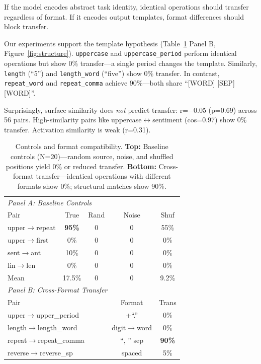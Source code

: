 \documentclass[sigconf,anonymous]{acmart}
\begin{document}
If the model encodes abstract task identity, identical operations should transfer regardless of format. If it encodes output templates, format differences should block transfer.

Our experiments support the template hypothesis (Table~\ref{tab:controls_format} Panel B, Figure~\ref{fig:structure}). \texttt{uppercase} and \texttt{uppercase\_period} perform identical operations but show 0\% transfer---a single period changes the template. Similarly, \texttt{length} (``5'') and \texttt{length\_word} (``five'') show 0\% transfer. In contrast, \texttt{repeat\_word} and \texttt{repeat\_comma} achieve 90\%---both share ``[WORD] [SEP] [WORD]''.

Surprisingly, surface similarity does \emph{not} predict transfer: r=$-$0.05 (p=0.69) across 56 pairs. High-similarity pairs like uppercase$\leftrightarrow$sentiment (cos=0.97) show 0\% transfer. Activation similarity is weak (r=0.31).

\begin{table}[t]
\caption{Controls and format compatibility. \textbf{Top:} Baseline controls (N=20)---random source, noise, and shuffled positions yield 0\% or reduced transfer. \textbf{Bottom:} Cross-format transfer---identical operations with different formats show 0\%; structural matches show 90\%.}
\label{tab:controls_format}
\centering
\small
\begin{tabular}{@{}lcccc@{}}
\toprule
\multicolumn{5}{l}{\textit{Panel A: Baseline Controls}} \\
Pair & True & Rand & Noise & Shuf \\
\midrule
upper$\to$repeat & \textbf{95\%} & 0 & 0 & 55\% \\
upper$\to$first & 0\% & 0 & 0 & 0\% \\
sent$\to$ant & 10\% & 0 & 0 & 0\% \\
lin$\to$len & 0\% & 0 & 0 & 0\% \\
Mean & 17.5\% & 0 & 0 & 9.2\% \\
\midrule
\multicolumn{5}{l}{\textit{Panel B: Cross-Format Transfer}} \\
\multicolumn{3}{l}{Pair} & Format & Trans \\
\midrule
\multicolumn{3}{l}{upper$\to$upper\_period} & +``.'' & 0\% \\
\multicolumn{3}{l}{length$\to$length\_word} & digit$\to$word & 0\% \\
\multicolumn{3}{l}{repeat$\to$repeat\_comma} & ``, '' sep & \textbf{90\%} \\
\multicolumn{3}{l}{reverse$\to$reverse\_sp} & spaced & 5\% \\
\bottomrule
\end{tabular}
\end{table}
\end{document}
